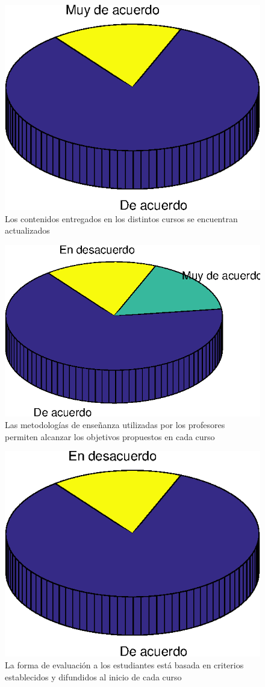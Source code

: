 \begin{figure}[ht]
\centering
\includegraphics[width=0.5\columnwidth]{./figure/graph17.eps}
\caption{Los contenidos entregados en los distintos cursos se encuentran actualizados}
\label{graph17}
\end{figure}

\begin{figure}[ht]
\centering
\includegraphics[width=0.5\columnwidth]{./figure/graph18.eps}
\caption{Las metodologías de enseñanza utilizadas por los profesores permiten alcanzar los objetivos propuestos en cada curso}
\label{graph18}
\end{figure}

\begin{figure}[ht]
\centering
\includegraphics[width=0.5\columnwidth]{./figure/graph19.eps}
\caption{La forma de evaluación a los estudiantes está basada en criterios establecidos y difundidos al inicio de cada curso}
\label{graph19}
\end{figure}

